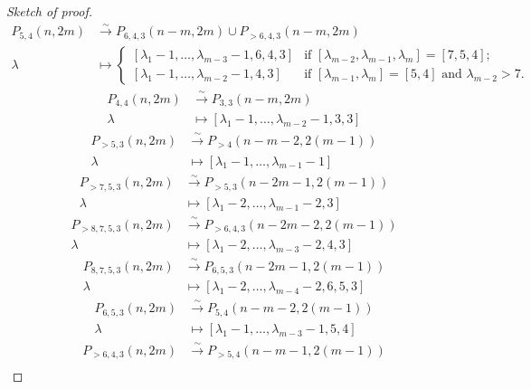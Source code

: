 \documentclass[a4paper, 12pt, reqno]{amsart}
\theoremstyle{remark}
\numberwithin{equation}{subsection}
\begin{document}
\begin{proof}[Sketch of proof]
\begin{align*}
    P_{5, 4}(n, 2m) &\xrightarrow{\sim} P_{6, 4, 3}(n - m, 2m) \cup P_{>6, 4, 3}(n - m, 2m) \\
    \lambda &\mapsto
              \begin{cases}
                [\lambda_1 - 1, \dots, \lambda_{m - 3} - 1, 6, 4, 3] &\text{if }[\lambda_{m - 2}, \lambda_{m - 1}, \lambda_m] = [7, 5, 4]; \\
                [\lambda_1 - 1, \dots, \lambda_{m - 2} - 1, 4, 3] &\text{if }[\lambda_{m - 1}, \lambda_m] = [5, 4]\text{ and }\lambda_{m - 2} > 7.
              \end{cases}
  \end{align*}
  \begin{align*}
    P_{4, 4}(n, 2m) &\xrightarrow{\sim} P_{3, 3}(n - m, 2m) \\
    \lambda &\mapsto [\lambda_1 - 1, \dots, \lambda_{m - 2} - 1, 3, 3]
  \end{align*}
  \begin{align*}
    P_{>5, 3}(n, 2m) &\xrightarrow{\sim} P_{>4}(n - m - 2, 2(m - 1)) \\
    \lambda &\mapsto [\lambda_1 - 1, \dots, \lambda_{m - 1} - 1]
  \end{align*}
  \begin{align*}
    P_{>7, 5, 3}(n, 2m) &\xrightarrow{\sim} P_{>5, 3}(n - 2m - 1, 2(m - 1)) \\
    \lambda &\mapsto [\lambda_1 - 2, \dots, \lambda_{m - 1} - 2, 3]
  \end{align*}
  \begin{align*}
    P_{>8, 7, 5, 3}(n, 2m) &\xrightarrow{\sim} P_{>6, 4, 3}(n - 2m - 2, 2(m - 1)) \\
    \lambda &\mapsto [\lambda_1 - 2, \dots, \lambda_{m - 3} - 2, 4, 3]
  \end{align*}
  \begin{align*}
    P_{8, 7, 5, 3}(n, 2m) &\xrightarrow{\sim} P_{6, 5, 3}(n - 2m - 1, 2(m - 1)) \\
    \lambda &\mapsto [\lambda_1 - 2, \dots, \lambda_{m - 4} - 2, 6, 5, 3]
  \end{align*}
  \begin{align*}
    P_{6, 5, 3}(n, 2m) &\xrightarrow{\sim} P_{5, 4}(n - m - 2, 2(m - 1)) \\
    \lambda &\mapsto [\lambda_1 - 1, \dots, \lambda_{m - 3} - 1, 5, 4]
  \end{align*}
  \begin{align*}
    P_{>6, 4, 3}(n, 2m) &\xrightarrow{\sim} P_{>5, 4}(n - m - 1, 2(m - 1)) \\

\end{align*}
\end{proof}
\end{document}
